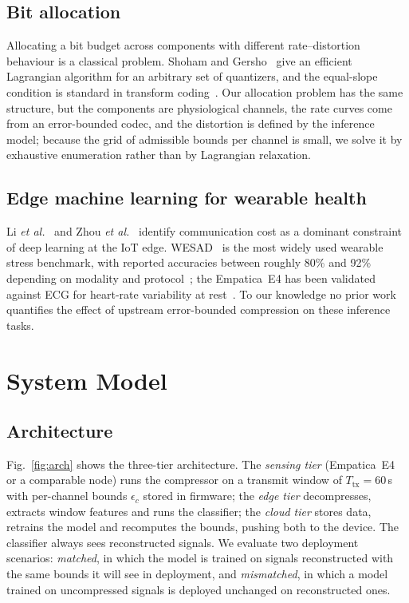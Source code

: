 \documentclass[journal,twoside,web]{ieeecolor}
\begin{document}
\subsection{Bit allocation}
Allocating a bit budget across components with different rate--distortion behaviour is a classical problem. Shoham and Gersho~\cite{shoham1988} give an efficient Lagrangian algorithm for an arbitrary set of quantizers, and the equal-slope condition is standard in transform coding~\cite{gersho1992}. Our allocation problem has the same structure, but the components are physiological channels, the rate curves come from an error-bounded codec, and the distortion is defined by the inference model; because the grid of admissible bounds per channel is small, we solve it by exhaustive enumeration rather than by Lagrangian relaxation.

\subsection{Edge machine learning for wearable health}
Li \emph{et al.}~\cite{li2018} and Zhou \emph{et al.}~\cite{zhou2019} identify communication cost as a dominant constraint of deep learning at the IoT edge. WESAD~\cite{schmidt2018} is the most widely used wearable stress benchmark, with reported accuracies between roughly 80\% and 92\% depending on modality and protocol~\cite{sipele2023}; the Empatica~E4 has been validated against ECG for heart-rate variability at rest~\cite{schuurmans2020}. To our knowledge no prior work quantifies the effect of upstream error-bounded compression on these inference tasks.

\section{System Model}
\subsection{Architecture}
Fig.~\ref{fig:arch} shows the three-tier architecture. The \emph{sensing tier} (Empatica~E4 or a comparable node) runs the compressor on a transmit window of $T_{\mathrm{tx}}=60$\,s with per-channel bounds $\epsilon_c$ stored in firmware; the \emph{edge tier} decompresses, extracts window features and runs the classifier; the \emph{cloud tier} stores data, retrains the model and recomputes the bounds, pushing both to the device. The classifier always sees reconstructed signals. We evaluate two deployment scenarios: \emph{matched}, in which the model is trained on signals reconstructed with the same bounds it will see in deployment, and \emph{mismatched}, in which a model trained on uncompressed signals is deployed unchanged on reconstructed ones.
\end{document}
